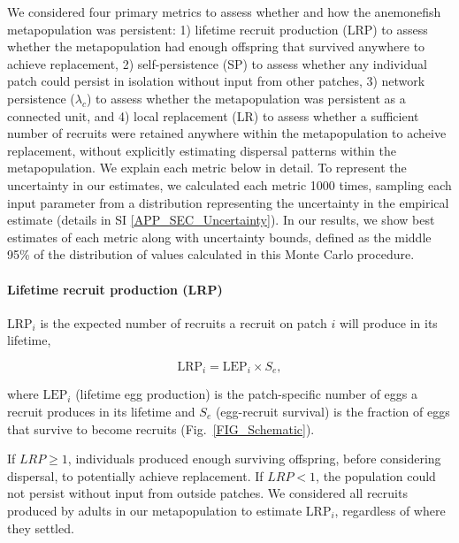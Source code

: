 \documentclass[12pt, oneside]{article}   	%
\begin{document}
We considered four primary metrics to assess whether and how the anemonefish metapopulation was persistent: 1) lifetime recruit production (LRP) to assess whether the metapopulation had enough offspring that survived anywhere to achieve replacement, 2) self-persistence (SP) to assess whether any individual patch could persist in isolation without input from other patches, 3) network persistence ($\lambda_c$) to assess whether the metapopulation was persistent as a connected unit, and 4) local replacement (LR) to assess whether a sufficient number of recruits were retained anywhere within the metapopulation to acheive replacement, without explicitly estimating dispersal patterns within the metapopulation. We explain each metric below in detail. To represent the uncertainty in our estimates, we calculated each metric 1000 times, sampling each input parameter from a distribution representing the uncertainty in the empirical estimate (details in SI \ref{APP_SEC_Uncertainty}). In our results, we show best estimates of each metric along with uncertainty bounds, defined as the middle 95\% of the distribution of values calculated in this Monte Carlo procedure. %

\paragraph*{Lifetime recruit production (LRP)}
$\text{LRP}_i$ is the expected number of recruits a recruit on patch $i$ will produce in its lifetime,

\begin{equation}
\text{LRP}_i = \text{LEP}_i \times S_e, \label{EQN_LRP}
\end{equation}

where $\text{LEP}_i$ (lifetime egg production) is the patch-specific number of eggs a recruit produces in its lifetime and $S_e$ (egg-recruit survival) is the fraction of eggs that survive to become recruits (Fig.\ \ref{FIG_Schematic}).

If $LRP \geq 1$, individuals produced enough surviving offspring, before considering dispersal, to potentially achieve replacement. If $LRP < 1$, the population could not persist without input from outside patches. We considered all recruits produced by adults in our metapopulation to estimate $\text{LRP}_i$, regardless of where they settled. %
\end{document}
